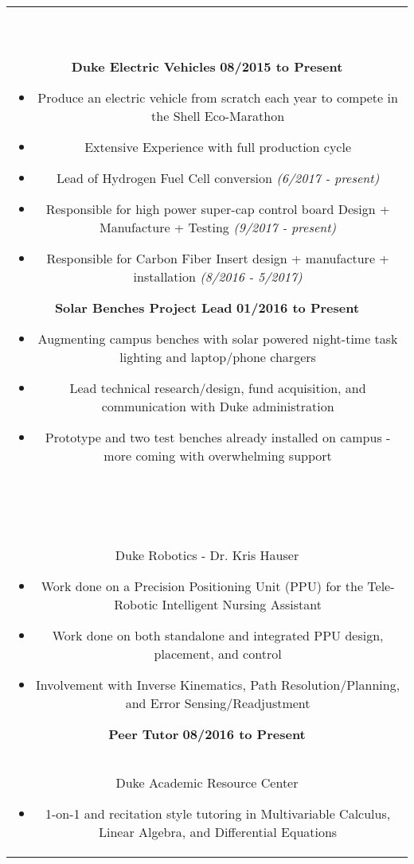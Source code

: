 \documentclass[11pt]{amsart}
\newcommand*\ruleline[1]{\par\noindent\raisebox{.8ex}{\makebox[\linewidth]{\hrulefill\hspace{1ex}\raisebox{-.8ex}{\Large~#1~}\hspace{1ex}\hrulefill}}\\ \-\ \vspace{-1em}}
\begin{document}
\begin{center}
\begin{tabular}{c}
	\ruleline{Activities}
	\begin{minipage}{\textwidth}
		{\bf Duke Electric Vehicles} \hfill {\bf 08/2015 to Present}
		\begin{itemize}
			\item Produce an electric vehicle from scratch each year to compete in the Shell Eco-Marathon
			\item Extensive Experience with full production cycle
			\item Lead of Hydrogen Fuel Cell conversion {\it (6/2017 - present)}
			\item Responsible for high power super-cap control board Design + Manufacture + Testing {\it (9/2017 - present)}
			\item Responsible for Carbon Fiber Insert design + manufacture + installation {\it (8/2016 - 5/2017)}
		\end{itemize}
		{\bf Solar Benches Project Lead} \hfill {\bf 01/2016 to Present}
		\begin{itemize}
			\item Augmenting campus benches with solar powered night-time task lighting and laptop/phone chargers
			\item Lead technical research/design, fund acquisition, and communication with Duke administration
			\item Prototype and two test benches already installed on campus - more coming with overwhelming support
		\end{itemize}
	\end{minipage}\\~\\
	
	\ruleline{Work History}
	\begin{minipage}{\textwidth}
		{\bf Robotics NSF REU Internship} \hfill {\bf 05/2017 to Present}\\
		{Duke Robotics - Dr. Kris Hauser}
		\begin{itemize}
			\item Work done on a Precision Positioning Unit (PPU) for the Tele-Robotic Intelligent Nursing Assistant
			\item Work done on both standalone and integrated PPU design, placement, and control
			\item Involvement with Inverse Kinematics, Path Resolution/Planning, and Error Sensing/Readjustment
		\end{itemize}
		
		{\bf Peer Tutor} \hfill {\bf 08/2016 to Present}\\
		{Duke Academic Resource Center}
		\begin{itemize}
			\item 1-on-1 and recitation style tutoring in Multivariable Calculus, Linear Algebra, and Differential Equations
		\end{itemize}
		

\end{minipage}
\end{tabular}
\end{center}
\end{document}
